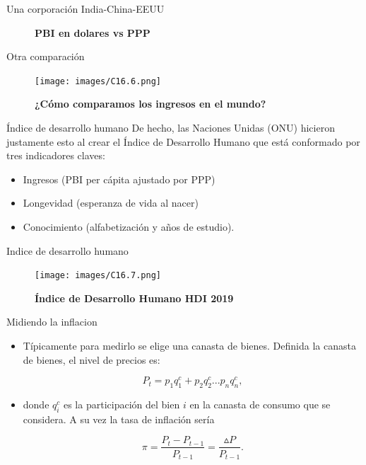 \documentclass{beamer}
\begin{document}
\begin{frame}{Una corporación India-China-EEUU}
   \begin{figure}[H]
\centering
  \hfill 
\caption{\textbf{PBI en dolares vs PPP}}
\end{figure} 
\end{frame}

\begin{frame}{Otra comparación}
    \begin{figure} [H]   \texttt{[image: images/C16.6.png]}
\caption{\textbf{¿Cómo comparamos los ingresos en el mundo?}}
\label{fig:16.6}
\end{figure}

\end{frame}


\begin{frame}{Índice de desarrollo humano}
    De hecho, las Naciones Unidas (ONU) hicieron justamente esto al crear el Índice de Desarrollo Humano que está conformado por tres indicadores claves: 

\begin{itemize}
    \item Ingresos (PBI per cápita ajustado por PPP)
\item Longevidad (esperanza de vida al nacer)
\item Conocimiento (alfabetización y años de estudio).
\end{itemize}
\end{frame}


\begin{frame}{Indice de desarrollo humano}
    
\begin{figure} [H]  \texttt{[image: images/C16.7.png]}
\caption{\textbf{Índice de Desarrollo Humano HDI 2019}}
\label{fig:25.7}
\end{figure}
\end{frame}


\begin{frame}{Midiendo la inflacion}
\begin{itemize}    
\item Típicamente para medirlo se elige una canasta de bienes. Definida la canasta de bienes, el nivel de precios es: 

\begin{equation}
P_t = p_1 q_1^c+ p_2 q_2^c...p_n q_n^c,
\end{equation}

\item donde $q_i^c$ es la participación del bien $i$ en la canasta de consumo que se considera. A su vez la tasa de inflación sería 

\begin{equation}
\pi =\frac{P_t - P_{t-1}}{P_{t-1}}= \frac{\vartriangle P}{P_{t-1}}.
\end{equation}
\end{itemize}
\end{frame}
\end{document}
